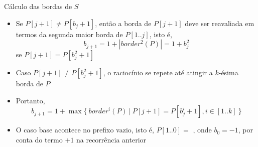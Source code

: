 \begin{frame}[fragile]{Cálculo das bordas de $S$}

    \begin{itemize}
        \item Se $P[j + 1] \neq P[b_j + 1]$, então a borda de $P[j + 1]$ deve ser reavaliada
            em termos da segunda maior borda de $P[1..j]$, isto é,
        \[
            b_{j + 1} = 1 + |border^2(P)| = 1 + b_j^2
        \]
        se $P[j + 1] = P[b_j^2 + 1]$

        \item Caso $P[j + 1] \neq P[b_j^2 + 1]$, o raciocínio se repete até atingir a $k$-ésima
            borda de $P$

        \item Portanto,
        \[
            b_{j + 1} = 1 + \max \lbrace\ border^i(P)\ |\ P[j + 1] = P[b_j^i + 1], i\in [1..k]\ \rbrace
        \]

        \item O caso base acontece no prefixo vazio, isto é, $P[1..0] = $ , onde
            $b_0 = -1$, por conta do termo $+1$ na recorrência anterior

    \end{itemize}

\end{frame}
